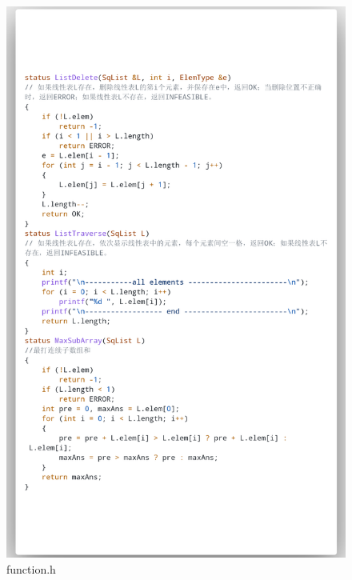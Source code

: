 \documentclass[supercite]{Experimental_Report}
\theoremstyle{definition}
\begin{document}
\begin{figure}[htb]
	\begin{center}
		\includegraphics[scale=0.30]{images/3-5.png}
		\caption{function.h}
		\label{fig3-5}
	\end{center}
\end{figure}
\end{document}
